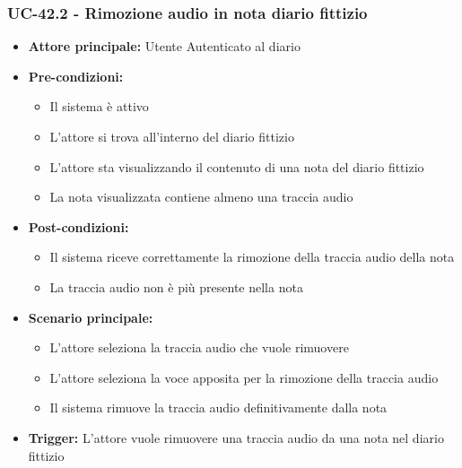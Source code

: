 \documentclass[a4paper,12pt]{article}
\begin{document}
\subsubsection{UC-42.2 - Rimozione audio in nota diario fittizio} \label{subsec:UC-42.2}
\begin{itemize}
    \item \textbf{Attore principale:} Utente Autenticato al diario
    \item \textbf{Pre-condizioni:}
    \begin{itemize}
        \item Il sistema è attivo
        \item L'attore si trova all'interno del diario fittizio
        \item L'attore sta visualizzando il contenuto di una nota del diario fittizio
        \item La nota visualizzata contiene almeno una traccia audio
    \end{itemize}
    \item \textbf{Post-condizioni:}
    \begin{itemize}
        \item Il sistema riceve correttamente la rimozione della traccia audio della nota
        \item La traccia audio non è più presente nella nota
    \end{itemize}
    \item \textbf{Scenario principale:}
    \begin{itemize}
        \item L'attore seleziona la traccia audio che vuole rimuovere
        \item L'attore seleziona la voce apposita per la rimozione della traccia audio
        \item Il sistema rimuove la traccia audio definitivamente dalla nota
    \end{itemize}
    \item \textbf{Trigger:} L'attore vuole rimuovere una traccia audio da una nota nel diario fittizio
\end{itemize}
\end{document}
